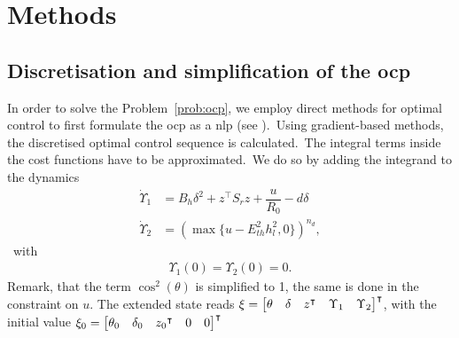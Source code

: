 \section{Methods}

\subsection{Discretisation and simplification of the \ac{ocp}}
In order to solve the Problem~\ref{prob:ocp}, we employ direct methods for optimal control to first formulate the \ac{ocp} as a \ac{nlp} (see \cite{Gerdts2011OC}).\ 
Using gradient-based methods, the discretised optimal control sequence is calculated.\ 
The integral terms inside the cost functions have to be approximated.\ 
We do so by adding the integrand to the dynamics
\begin{align*}
	\dot{\Upsilon}_1 &= B_h\delta^2 +z^\intercal S_r z +\dfrac{u}{R_0} - d \delta \nonumber\\
	\dot{\Upsilon}_2 &= \left(\max \{ u-E_{th}^2 h_l^2,0 \} \right)^{n_d},
\end{align*}\ 
with
\begin{align*}
	\Upsilon_1(0) = \Upsilon_2(0) = 0.
\end{align*}
Remark, that the term $\cos^2(\theta)$ is simplified to 1, the same is done in the constraint on $u$.
The extended state reads
$\xi = \begin{bmatrix}
	{\theta} &
	{\delta} & 
	{z{^\intercal}} &
	{\Upsilon_1} &
	{\Upsilon_2}
\end{bmatrix}^\intercal$, with the initial value $\xi_0 = \begin{bmatrix}
{\theta_0} &
{\delta_0} & 
{z_0{^\intercal}} &
{0} &
{0}
\end{bmatrix}^\intercal$

